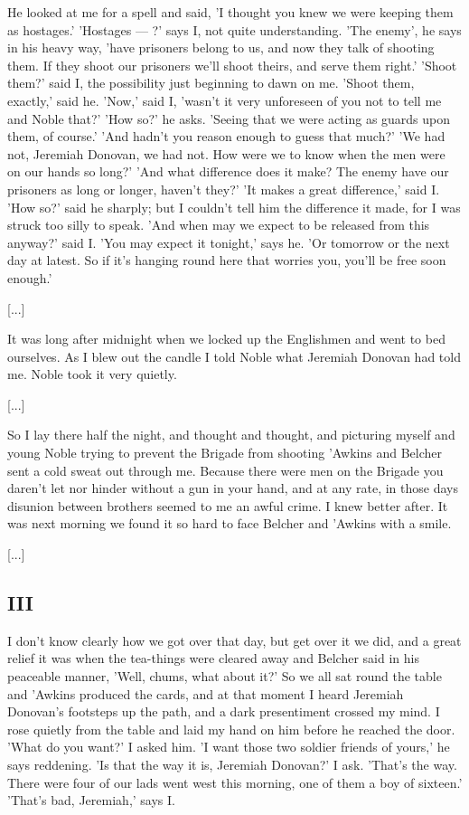\documentclass[10pt,a4paper]{article}
\begin{document}
He looked at me for a spell and said, 'I thought you knew we were keeping them as hostages.' 'Hostages — ?' says I, not quite understanding. 'The enemy', he says in his heavy way, 'have prisoners belong to us, and now they talk of shooting them. If they shoot our prisoners we'll shoot theirs, and serve them right.' 'Shoot them?' said I, the possibility just beginning to dawn on me. 'Shoot them, exactly,' said he. 'Now,' said I, 'wasn't it very unforeseen of you not to tell me and Noble that?' 'How so?' he asks. 'Seeing that we were acting as guards upon them, of course.' 'And hadn't you reason enough to guess that much?' 'We had not, Jeremiah Donovan, we had not. How were we to know when the men were on our hands so long?' 'And what difference does it make? The enemy have our prisoners as long or longer, haven't they?' 'It makes a great difference,' said I. 'How so?' said he sharply; but I couldn't tell him the difference it made, for I was struck too silly to speak. 'And when may we expect to be released from this anyway?' said I. 'You may expect it tonight,' says he. 'Or tomorrow or the next day at latest. So if it's hanging round here that worries you, you'll be free soon enough.' 

[...]

It was long after midnight when we locked up the Englishmen and went to bed ourselves. As I blew out the candle I told Noble what Jeremiah Donovan had told me. Noble took it very quietly. 

[...]

So I lay there half the night, and thought and thought, and picturing myself and young Noble trying to prevent the Brigade from shooting 'Awkins and Belcher sent a cold sweat out through me. Because there were men on the Brigade you daren't let nor hinder without a gun in your hand, and at any rate, in those days disunion between brothers seemed to me an awful crime. I knew better after. It was next morning we found it so hard to face Belcher and 'Awkins with a smile.

[...]

\subsection{III}

I don't know clearly how we got over that day, but get over it we did, and a great relief it was when the tea-things were cleared away and Belcher said in his peaceable manner, 'Well, chums, what about it?' So we all sat round the table and 'Awkins produced the cards, and at that moment I heard Jeremiah Donovan's footsteps up the path, and a dark presentiment crossed my mind. I rose quietly from the table and laid my hand on him before he reached the door. 'What do you want?' I asked him. 'I want those two soldier friends of yours,' he says reddening. 'Is that the way it is, Jeremiah Donovan?' I ask. 'That's the way. There were four of our lads went west this morning, one of them a boy of sixteen.' 'That's bad, Jeremiah,' says I. 
\end{document}
